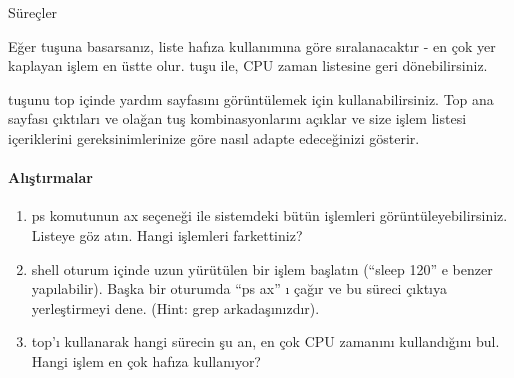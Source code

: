 \begin{section}{Süreçler}
\begin{itemize}
Eğer  tuşuna basarsanız, liste hafıza kullanımına göre sıralanacaktır - en çok yer kaplayan işlem en üstte olur.  tuşu ile, CPU zaman listesine geri dönebilirsiniz.

 tuşunu top içinde yardım sayfasını görüntülemek için kullanabilirsiniz. Top ana sayfası çıktıları ve olağan tuş kombinasyonlarını açıklar ve size işlem listesi içeriklerini gereksinimlerinize göre nasıl adapte edeceğinizi gösterir.
\end{itemize}
\paragraph{{\Huge{\PencilLeftDown}}Alıştırmalar}{
\begin{enumerate}
 \item ps komutunun ax seçeneği ile sistemdeki bütün işlemleri görüntüleyebilirsiniz. Listeye göz atın. Hangi işlemleri farkettiniz?
 \item shell oturum içinde uzun yürütülen bir işlem başlatın (“sleep 120” e benzer yapılabilir). Başka bir oturumda  “ps ax” ı çağır ve bu süreci çıktıya 
yerleştirmeyi dene. (Hint: grep arkadaşınızdır).
\item top'ı kullanarak hangi sürecin şu an, en çok CPU zamanını kullandığını bul. Hangi işlem en çok hafıza kullanıyor?
\end{enumerate}}
\end{section}
